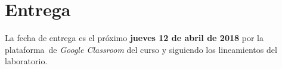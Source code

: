 \documentclass[paper=letter, fontsize=12pt]{scrartcl}
\begin{document}
\section{Entrega}

\noindent
La fecha de entrega es el próximo \textbf{jueves 12 de abril de 2018} por la plataforma\
de \emph{Google Classroom} del curso y siguiendo los lineamientos del laboratorio.
\end{document}
